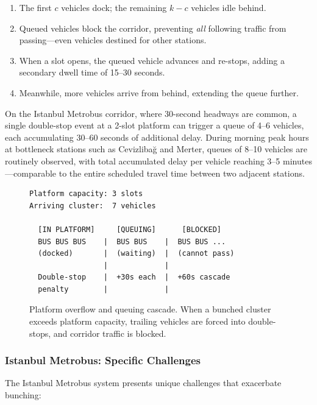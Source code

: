 \begin{itemize}
\begin{enumerate}
        \item The first $c$ vehicles dock; the remaining $k - c$ vehicles idle behind.
        \item Queued vehicles block the corridor, preventing \textit{all} following traffic from passing---even vehicles destined for other stations.
        \item When a slot opens, the queued vehicle advances and re-stops, adding a secondary dwell time of 15--30 seconds.
        \item Meanwhile, more vehicles arrive from behind, extending the queue further.
    \end{enumerate}
    On the Istanbul Metrobus corridor, where 30-second headways are common, a single double-stop event at a 2-slot platform can trigger a queue of 4--6 vehicles, each accumulating 30--60 seconds of additional delay. During morning peak hours at bottleneck stations such as Cevizlibağ and Merter, queues of 8--10 vehicles are routinely observed, with total accumulated delay per vehicle reaching 3--5 minutes---comparable to the entire scheduled travel time between two adjacent stations.
\end{itemize}

\begin{figure}[h]
\centering
\begin{verbatim}
Platform capacity: 3 slots
Arriving cluster:  7 vehicles

  [IN PLATFORM]     [QUEUING]      [BLOCKED]
  BUS BUS BUS    |  BUS BUS    |  BUS BUS ...
  (docked)       |  (waiting)  |  (cannot pass)
                 |             |
  Double-stop    |  +30s each  |  +60s cascade
  penalty        |             |
\end{verbatim}
\caption{Platform overflow and queuing cascade. When a bunched cluster exceeds platform capacity, trailing vehicles are forced into double-stops, and corridor traffic is blocked.}
\label{fig:platform_overflow}
\end{figure}

\subsubsection{Istanbul Metrobus: Specific Challenges}

The Istanbul Metrobus system presents unique challenges that exacerbate bunching:

